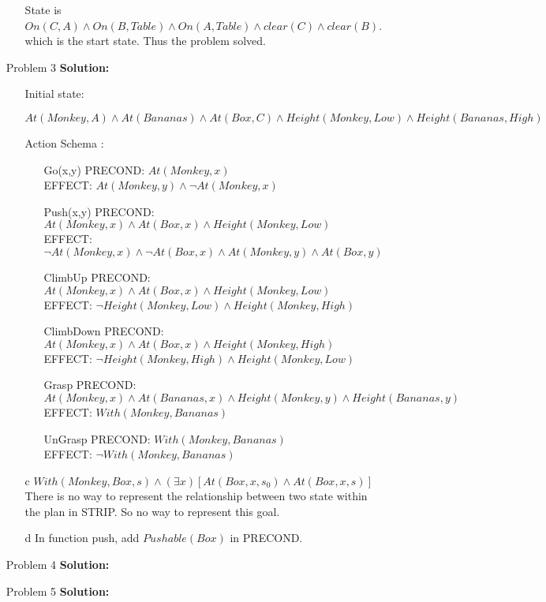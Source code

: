 \normalfont\documentclass[letterpaper,11pt]{article}
\begin{document}
\begin{enumerate}
\begin{enumerate}
			State is $On(C,A)\land On(B,Table) \land On(A,Table) \land clear(C)\land clear(B)$. which is the start state. Thus the problem solved.
	\end{enumerate}
\item[Problem 3]\textbf{Solution:}\par
\begin{enumerate}
	\item[Initial state:] \par
		$At(Monkey,A)\land At(Bananas) \land At(Box,C) \land Height(Monkey, Low) \land Height(Bananas, High)$
	\item[Action Schema]: \par
		\begin{enumerate}
			\item[Go(x,y)]
				PRECOND: $At(Monkey, x)$\\
				EFFECT: $At(Monkey, y) \land \neg At(Monkey, x)$
			\item[Push(x,y)]
				PRECOND: $At(Monkey, x) \land At(Box,x) \land Height(Monkey, Low)$\\
				EFFECT: $\neg At(Monkey, x) \land \neg At(Box,x) \land At(Monkey, y) \land At(Box,y)$
			\item[ClimbUp]
				PRECOND: $At(Monkey, x) \land At(Box,x) \land Height(Monkey, Low)$\\
				EFFECT: $\neg Height(Monkey, Low) \land Height(Monkey, High)$
			\item[ClimbDown]
				PRECOND: $At(Monkey, x) \land At(Box,x) \land Height(Monkey, High)$\\
				EFFECT: $\neg Height(Monkey, High) \land Height(Monkey, Low)$
			\item[Grasp]
				PRECOND: $At(Monkey, x) \land At(Bananas,x) \land Height(Monkey, y)\land Height(Bananas, y)$\\
				EFFECT: $With(Monkey, Bananas)$
			\item[UnGrasp]
				PRECOND: $With(Monkey, Bananas)$\\
				EFFECT: $\neg With(Monkey, Bananas)$
		\end{enumerate}
	\item[c] $With(Monkey, Box, s) \land (\exists x)[At(Box, x, s_0)\land At(Box,x,s)]$\\
	There is no way to represent the relationship between two state within the plan in STRIP. So no way to represent this goal.
	\item[d] In function push, add $Pushable(Box)$ in PRECOND.
\end{enumerate}
\item[Problem 4]\textbf{Solution:}\par
\item[Problem 5]\textbf{Solution:}\par
\end{enumerate}
\end{document}
